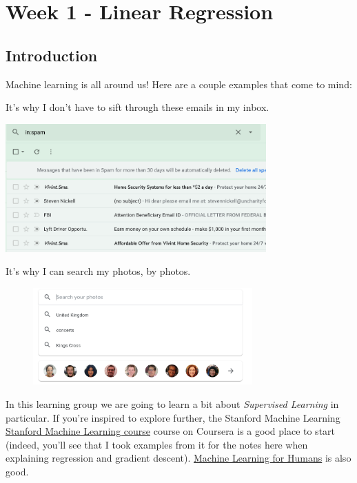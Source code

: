 \documentclass[12pt]{article}
\begin{document}
\section{Week 1 - Linear Regression}
\subsection{Introduction}

Machine learning is all around us! Here are a couple examples that come to mind:


It's why I don't have to sift through these emails in my inbox.

\includegraphics[width=0.75\textwidth]{spam}

It's why I can search my photos, by photos.

\begin{figure}[h]
\includegraphics[width=0.75\textwidth]{photo-search}
\end{figure}


In this learning group we are going to learn a bit about \textit{Supervised Learning} in particular. If you're inspired to explore further, the Stanford Machine Learning \href{https://www.coursera.org/learn/machine-learning}{Stanford Machine Learning course} course on Coursera is a good place to start (indeed, you'll see that I took examples from it for the notes here when explaining regression and gradient descent). \href{https://medium.com/machine-learning-for-humans/why-machine-learning-matters-6164faf1df12}{Machine Learning for Humans} is also good.
\end{document}
